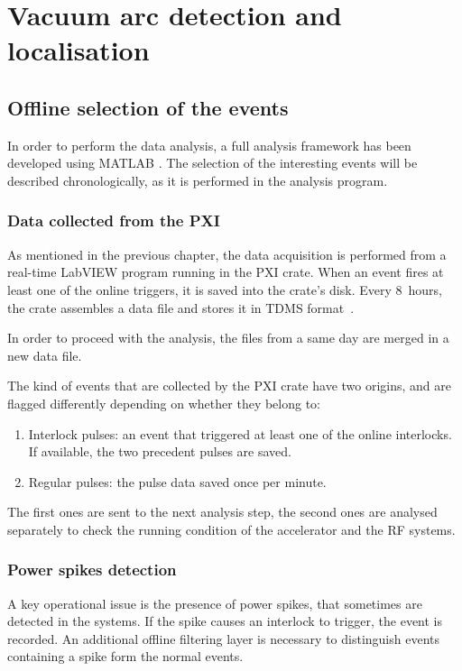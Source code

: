 \chapter[Vacuum arc detection and  localisation]{Vacuum arc detection and  localisation}

\section[Offline selection of the events]{Offline selection of the events}

In order to perform the data analysis, a full analysis framework has been developed using MATLAB \cite{MW:matlab}. The selection of the interesting events will be described chronologically, as it is performed in the analysis program.

\subsection[Data collected from the PXI]{Data collected from the PXI}

As mentioned in the previous chapter, the data acquisition is performed from a real-time LabVIEW program running in the PXI crate. When an event fires at least one of the online triggers, it is saved into the crate's disk. Every 8~hours, the crate assembles a data file and stores it in TDMS format~\cite{NI:TDMS}. 

In order to proceed with the analysis, the files from a same day are merged in a new data file.

The kind of events that are collected by the PXI crate have two origins, and are flagged differently depending on whether they belong to:
\begin{enumerate}
\item Interlock pulses: an event that triggered at least one of the online interlocks. If available, the two precedent pulses are saved.
\item Regular pulses: the pulse data saved once per minute.
\end{enumerate}
The first ones are sent to the next analysis step, the second ones are analysed separately to check the running condition of the accelerator and the RF systems.

\subsection[Power spikes detection]{Power spikes detection}

A key operational issue is the presence of power spikes, that sometimes are detected in the systems. If the spike causes an interlock to trigger, the event is recorded. An additional offline filtering layer is necessary to distinguish events containing a spike form the normal events.

